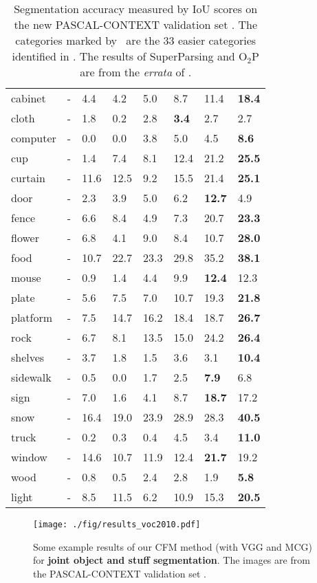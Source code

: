 \documentclass[10pt,twocolumn,letterpaper]{article}
\begin{document}
\begin{table}
\begin{center}
{\begin{tabular}{|x|xx|xxx|x|x|}
	cabinet&-&4.4&4.2&5.0&{8.7}&11.4&\textbf{18.4}\\
	cloth&-&1.8&0.2&2.8&\textbf{3.4}&{2.7}&2.7\\
	computer&-&0.0&0.0&3.8&5.0&{4.5}&\textbf{8.6}\\
	cup&-&1.4&7.4&8.1&{12.4}&21.2&\textbf{25.5}\\
	curtain&-&11.6&12.5&9.2&{15.5}&21.4&\textbf{25.1}\\
	door&-&2.3&3.9&5.0&{6.2}&{\textbf{12.7}}&4.9\\
	fence&-&6.6&{8.4}&4.9&7.3&20.7&\textbf{23.3}\\
	flower&-&6.8&4.1&{9.0}&8.4&{10.7}&\textbf{28.0}\\
	food&-&10.7&22.7&23.3&{29.8}&35.2&\textbf{38.1}\\
	mouse&-&0.9&1.4&4.4&{9.9}&\textbf{12.4}&12.3\\
	plate&-&5.6&7.5&7.0&{10.7}&19.3&\textbf{21.8}\\
	platform&-&7.5&14.7&16.2&{18.4}&18.7&\textbf{26.7}\\
	rock&-&6.7&8.1&13.5&{15.0}&24.2&\textbf{26.4}\\
	shelves&-&{3.7}&1.8&1.5&3.6&{3.1}&\textbf{10.4}\\
	sidewalk&-&0.5&0.0&1.7&{2.5}&{\textbf{7.9}}&6.8\\
	sign&-&7.0&1.6&4.1&{8.7}&\textbf{18.7}&17.2\\
	snow&-&16.4&19.0&23.9&{28.9}&{28.3}&\textbf{40.5}\\
	truck&-&0.2&0.3&0.4&{4.5}&{3.4}&\textbf{11.0}\\
	window&-&{14.6}&10.7&11.9&12.4&{\textbf{21.7}}&19.2\\
	wood&-&0.8&0.5&2.4&2.8&{1.9}&\textbf{5.8}\\
	light&-&8.5&{11.5}&6.2&10.9&{15.3}&\textbf{20.5}\\
	\hline
\end{tabular}}
\end{center}
\caption{Segmentation accuracy measured by IoU scores on the new PASCAL-CONTEXT validation set \cite{mottaghi2014role}. The categories marked by \dag~are the 33 easier categories identified in \cite{mottaghi2014role}. The results of SuperParsing \cite{tighe2010superparsing} and O$_2$P \cite{carreira2012semantic} are from the \emph{errata} of \cite{mottaghi2014role}.}
\label{tab:voc2010_approaches}
\end{table}

\begin{figure*}[t]
  \centering
  \texttt{[image: ./fig/results\_voc2010.pdf]}
  \caption{Some example results of our CFM method (with VGG and MCG) for \textbf{joint object and stuff segmentation}. The images are from the PASCAL-CONTEXT validation set \cite{mottaghi2014role}.}
  \label{fig:segmentation_examples}
\end{figure*}
\end{document}

